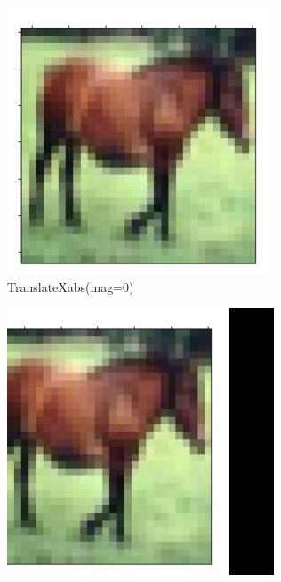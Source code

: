 \documentclass[onecolumn]{ujarticle}   %
\begin{document}
\begin{figure}[h]
      \begin{subfigure}{0.3\columnwidth}
        \centering
        \includegraphics[width=1.0\columnwidth]{transform_test/TranslateXabs_0.png}
        \caption{TranslateXabs(mag=0)}
        \label{fig:TranslateXabs_0}
      \end{subfigure}
      \begin{subfigure}{0.3\columnwidth}
        \centering
        \includegraphics[width=1.0\columnwidth]{transform_test/TranslateXabs_15.png}

\end{subfigure}
\end{figure}
\end{document}
